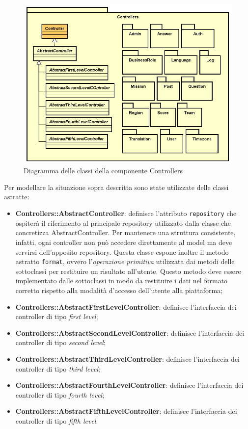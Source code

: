 \begin{figure}[H]
	\centering
  \includegraphics[scale=0.95, width=\textwidth]{immagini/components/controllers_diagram.png}
  \caption{Diagramma delle classi della componente Controllers}
	\label{fig:controllers} 
\end{figure}

Per modellare la situazione sopra descritta sono state utilizzate delle classi astratte:

\begin{itemize}
	\item \textbf{Controllers::AbstractController}: definisce l'attributo \verb!repository! che ospiterà il riferimento al principale repository utilizzato dalla classe che concretizza AbstractController. Per mantenere una struttura consistente, infatti, ogni controller non può accedere direttamente al model ma deve servirsi dell'apposito repository. Questa classe espone inoltre il metodo astratto \verb!format!, ovvero l'\textit{operazione primitiva} utilizzata dai metodi delle sottoclassi per restituire un risultato all'utente. Questo metodo deve essere implementato dalle sottoclassi in modo da restituire i dati nel formato corretto rispetto alla modalità d'accesso dell'utente alla piattaforma; 
	\item \textbf{Controllers::AbstractFirstLevelController}: definisce l'interfaccia dei controller di tipo \textit{first level};
	\item \textbf{Controllers::AbstractSecondLevelController}: definisce l'interfaccia dei controller di tipo \textit{second level};
	\item \textbf{Controllers::AbstractThirdLevelController}: definisce l'interfaccia dei controller di tipo \textit{third level};
	\item \textbf{Controllers::AbstractFourthLevelController}: definisce l'interfaccia dei controller di tipo \textit{fourth level};
	\item \textbf{Controllers::AbstractFifthLevelController}: definisce l'interfaccia dei controller di tipo \textit{fifth level}.
\end{itemize}

